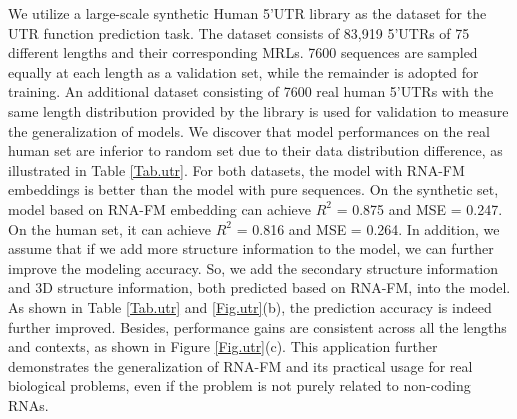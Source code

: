 We utilize a large-scale synthetic Human 5’UTR library \cite{sample2019human} as the dataset for the UTR function prediction task. The dataset consists of 83,919 5’UTRs of 75 different lengths and their corresponding MRLs. 7600 sequences are sampled equally at each length as a validation set, while the remainder is adopted for training. An additional dataset consisting of 7600 real human 5’UTRs with the same length distribution provided by the library is used for validation to measure the generalization of models. %
We discover that model performances on the real human set are inferior to random set due to their data distribution difference, as illustrated in Table \ref{Tab.utr}. For both datasets, the model with RNA-FM embeddings is better than the model with pure sequences. On the synthetic set, model based on RNA-FM embedding can achieve $R^2$ = 0.875 and MSE = 0.247. On the human set, it  can achieve $R^2$ = 0.816 and MSE = 0.264. In addition, we assume that if we add more structure information to the model, we can further improve the modeling accuracy. So, we add the secondary structure information and 3D structure information, both predicted based on RNA-FM, into the model. As shown in Table \ref{Tab.utr} and \ref{Fig.utr}(b), the prediction accuracy is indeed further improved. 
Besides, performance gains are consistent across all the lengths and contexts, as shown in Figure \ref{Fig.utr}(c). This application further demonstrates the generalization of RNA-FM and its practical usage for real biological problems, even if the problem is not purely related to non-coding RNAs.

